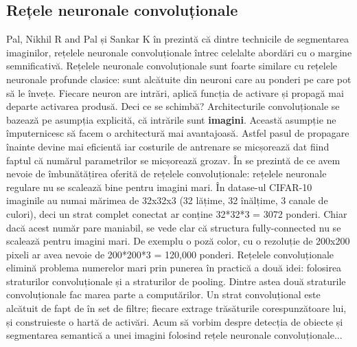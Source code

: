 \subsection{Rețele neuronale convoluționale}
Pal, Nikhil R and Pal și Sankar K în \cite{pal1993review} prezintă că dintre technicile de segmentarea imaginilor, rețelele neuronale convoluționale întrec celelalte abordări cu o margine semnificativă.\newline
Rețelele neuronale convoluționale sunt foarte similare cu rețelele neuronale profunde clasice: sunt alcătuite din neuroni care au ponderi pe care pot să le învețe. Fiecare neuron are intrări, aplică funcția de activare și propagă mai departe activarea produsă.\newline
Deci ce se schimbă? Architecturile convoluționale se bazează pe asumpția explicită, că intrările sunt \textbf{imagini}. Această asumpție ne împuternicesc să facem o architectură mai avantajoasă. Astfel pasul de propagare înainte devine mai eficientă iar costurile de antrenare se micșorează dat fiind faptul că numărul parametrilor se micșorează grozav.
În \cite{csfromuniversity} se prezintă de ce avem nevoie de îmbunătățirea oferită de rețelele convoluționale: rețelele neuronale regulare nu se scalează bine pentru imagini mari. În datase-ul CIFAR-10 imaginile au numai mărimea de 32x32x3 (32 lățime, 32 înălțime, 3 canale de culori), deci un strat complet conectat ar conține 32*32*3 = 3072 ponderi. Chiar dacă acest număr pare maniabil, se vede clar că structura fully-connected nu se scalează pentru imagini mari. De exemplu o poză color, cu o rezoluție de 200x200 pixeli ar avea nevoie de 200*200*3 = 120,000 ponderi.\newline
Rețelele convoluționale elimină problema numerelor mari prin punerea în practică a două idei: folosirea straturilor convoluționale și a straturilor de pooling. Dintre astea două straturile convoluționale fac marea parte a computărilor. Un strat convoluțional este alcătuit de fapt de în set de filtre; fiecare extrage trăsăturile corespunzătoare lui, și construieste o hartă de activări.\newline
Acum să vorbim despre detecția de obiecte și segmentarea semantică a unei imagini folosind rețele neuronale convoluționale...

